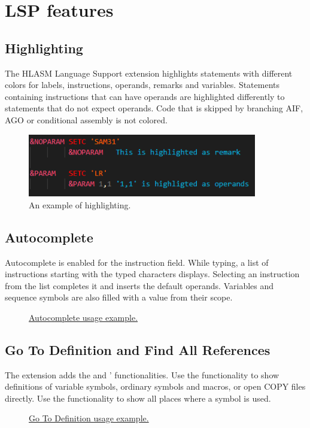 \chapter{LSP features}
\section{Highlighting}
The HLASM Language Support extension highlights statements with different colors for labels, instructions, operands, remarks and variables. Statements containing instructions that can have operands are highlighted differently to statements that do not expect operands. Code that is skipped by branching AIF, AGO or conditional assembly is not colored.

\begin{figure}[h]
	\centering
	\includegraphics[width=10cm]{img/highligting}
	\caption{An example of highlighting.}
\end{figure}

\section{Autocomplete}
Autocomplete is enabled for the instruction field. While typing, a list of instructions starting with the typed characters displays. Selecting an instruction from the list completes it and inserts the default operands. Variables and sequence symbols are also filled with a value from their scope.

\begin{figure}[H]
	\centering
	\caption{\href{https://github.com/eclipse/che-che4z-lsp-for-hlasm/blob/master/readme\_res/autocomplete.gif}{Autocomplete usage example.}}
\end{figure}

\section{Go To Definition and Find All References}
The extension adds the  and ' functionalities. Use the  functionality to show definitions of variable symbols, ordinary symbols and macros, or open COPY files directly. Use the  functionality to show all places where a symbol is used.
	
\begin{figure}[H]
	\centering
	\caption{\href{https://github.com/eclipse/che-che4z-lsp-for-hlasm/blob/master/readme\_res/go\_to\_def.gif}{Go To Definition usage example.}}
\end{figure}
	

